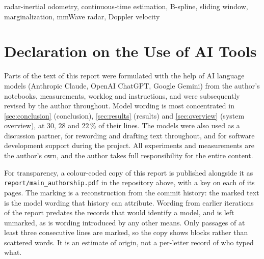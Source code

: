 \documentclass[journal]{IEEEtran}
\begin{document}
\begin{IEEEkeywords}
radar-inertial odometry, continuous-time estimation, B-spline,
sliding window, marginalization, mmWave radar, Doppler velocity
\end{IEEEkeywords}

\section*{Declaration on the Use of AI Tools}
Parts of the text of this report were formulated with the help of AI
language models (Anthropic Claude, OpenAI ChatGPT, Google Gemini)
from the author's notebooks,
measurements, worklog and instructions, and were subsequently revised
by the author throughout.  Model wording is most concentrated in
\autoref{sec:conclusion} (conclusion), \autoref{sec:results}
(results) and \autoref{sec:overview} (system overview), at $30$,
$28$ and $22$\,\% of their lines. The models were also used as a discussion
partner, for rewording and drafting text throughout, and for
software development support during the project.  All experiments and
measurements are the author's own, and the author takes full
responsibility for the entire content.

For transparency, a colour-coded copy of this report is published
alongside it as \texttt{report/main\_authorship.pdf} in the repository
above, with a key on each of its pages.  The marking is a
reconstruction from the commit history: the marked text is the model
wording that history can attribute.  Wording from earlier iterations
of the report predates the records that would identify a model, and
is left unmarked, as is wording introduced by any other means.
Only passages of at least three consecutive lines are marked, so the
copy shows blocks rather than scattered words.  It is an estimate of
origin, not a per-letter record of who typed what.














\end{document}
